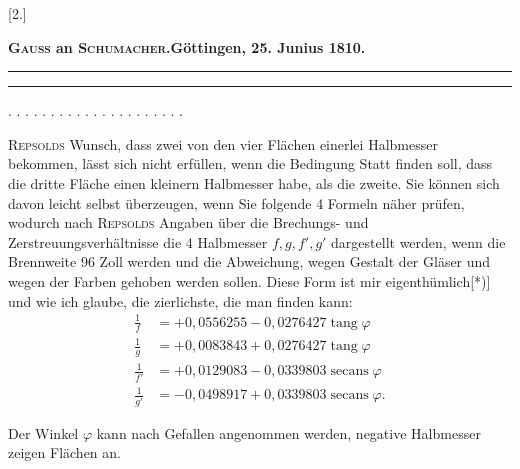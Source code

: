 \clearpage\begingroup
{}
\begin{center}
[2.]\par\medskip
\textbf{\textsc{Gauss} an \textsc{Schumacher}.\quad Göttingen, 25. Junius 1810.}\par\medskip
\rule{.75\linewidth}{.4pt}\par
[Briefwechsel zwischen \textsc{Gauss} und \textsc{Schumacher} I, S. 45 f.]\par
\rule{.75\linewidth}{.4pt}
\end{center}
\noindent . . . . . . . . . . . . . . . . . . . . .\par
\noindent\hspace*{\parindent}\textsc{Repsolds} Wunsch, dass zwei von den vier Flächen einerlei Halbmesser bekommen, lässt sich nicht erfüllen, wenn die Bedingung Statt finden soll, dass die dritte Fläche einen kleinern Halbmesser habe, als die zweite. Sie können sich davon leicht selbst überzeugen, wenn Sie folgende 4 Formeln näher prüfen, wodurch nach \textsc{Repsolds} Angaben über die Brechungs- und Zerstreuungsverhältnisse die 4 Halbmesser $f,g,f',g'$ dargestellt werden, wenn die Brennweite 96 Zoll werden und die Abweichung, wegen Gestalt der Gläser und wegen der Farben gehoben werden sollen. Diese Form ist mir eigenthümlich[*)] und wie ich glaube, die zierlichste, die man finden kann:
\begingroup\renewcommand{\thefootnote}{}\endgroup
\[
\begin{aligned}
\frac1f&=+0{,}0556255-0{,}0276427\operatorname{tang}\varphi\\[5pt]
\frac1g&=+0{,}0083843+0{,}0276427\operatorname{tang}\varphi\\[5pt]
\frac1{f'}&=+0{,}0129083-0{,}0339803\operatorname{secans}\varphi\\[5pt]
\frac1{g'}&=-0{,}0498917+0{,}0339803\operatorname{secans}\varphi.
\end{aligned}
\]

Der Winkel $\varphi$ kann nach Gefallen angenommen werden, negative Halbmesser zeigen  Flächen an.

